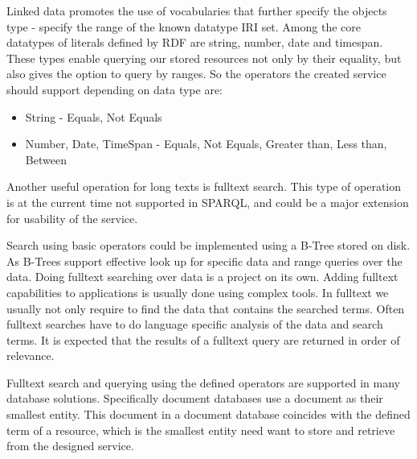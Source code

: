 Linked data promotes the use of vocabularies %
that further specify the objects type - specify the range of the known datatype IRI set.
Among the core datatypes of literals defined by RDF are string, number, date and timespan. These types enable querying our stored resources not only by their equality, but also gives the option to query by ranges. So the operators the created service should support depending on data type are:
\begin{itemize}
	\item String - Equals, Not Equals
	\item Number, Date, TimeSpan - Equals, Not Equals, Greater than, Less than, Between
\end{itemize}
Another useful operation for long texts is fulltext search. %
This type of operation is at the current time not supported in SPARQL, and could be a major extension for usability of the service.

Search using basic operators could be implemented using a B-Tree stored on disk. As B-Trees support effective look up for specific data and range queries over the data.
Doing fulltext searching over data is a project on its own. Adding fulltext capabilities to applications is usually done using complex tools. In fulltext we usually not only require to find the data that contains the searched terms. Often fulltext searches have to do language specific analysis of the data and search terms. It is expected that the results of a fulltext query are returned in order of relevance.

Fulltext search and querying using the defined operators are supported in many database solutions. Specifically document databases use a document as their smallest entity. This document in a document database coincides with the defined term of a resource, which is the smallest entity need want to store and retrieve from the designed service.

